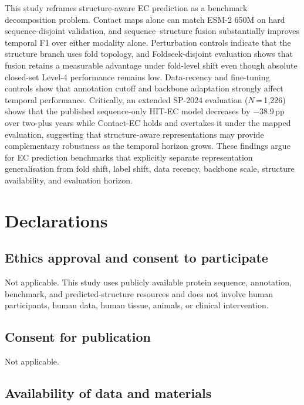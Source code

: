 \documentclass[numbered,contemporary,mediumone]{oup-authoring-template}
\begin{document}
This study reframes structure-aware EC prediction as a benchmark decomposition
problem. Contact maps alone can match ESM-2 650M on hard sequence-disjoint
validation, and sequence--structure fusion substantially improves temporal F1 over
either modality alone. Perturbation controls indicate that the structure branch uses
fold topology, and Foldseek-disjoint evaluation shows that fusion retains a
measurable advantage under fold-level shift even though absolute closed-set
Level-4 performance remains low. Data-recency and fine-tuning controls show that annotation
cutoff and backbone adaptation strongly affect temporal performance. Critically,
an extended SP-2024 evaluation ($N$\,=\,1{,}226) shows that the published
sequence-only HIT-EC model decreases by $-$38.9\,pp over two-plus years while Contact-EC
holds and overtakes it under the mapped evaluation, suggesting that structure-aware
representations may provide complementary robustness as the temporal horizon grows. These findings
argue for EC prediction benchmarks that explicitly separate representation
generalisation from fold shift, label shift, data recency, backbone scale,
structure availability, and evaluation horizon.

\section*{Declarations}

\subsection*{Ethics approval and consent to participate}
Not applicable. This study uses publicly available protein sequence,
annotation, benchmark, and predicted-structure resources and does not involve
human participants, human data, human tissue, animals, or clinical intervention.

\subsection*{Consent for publication}
Not applicable.

\subsection*{Availability of data and materials}
\end{document}
